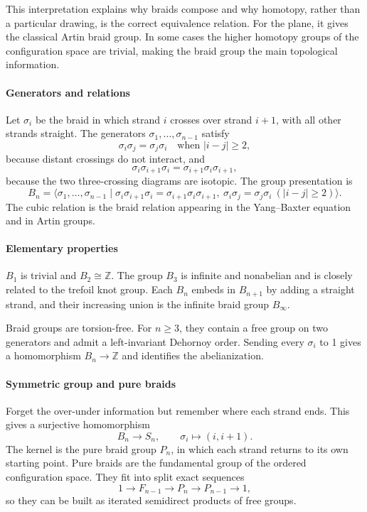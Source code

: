 This interpretation explains why braids compose and why homotopy, rather than a particular drawing, is the correct equivalence relation. For the plane, it gives the classical Artin braid group. In some cases the higher homotopy groups of the configuration space are trivial, making the braid group the main topological information.

\paragraph{Generators and relations}

Let $\sigma_i$ be the braid in which strand $i$ crosses over strand $i+1$, with all other strands straight. The generators $\sigma_1,\ldots,\sigma_{n-1}$ satisfy
\[
 \sigma_i\sigma_j=\sigma_j\sigma_i\quad\text{when }|i-j|\geq2,
\]
because distant crossings do not interact, and
\[
 \sigma_i\sigma_{i+1}\sigma_i=
 \sigma_{i+1}\sigma_i\sigma_{i+1},
\]
because the two three-crossing diagrams are isotopic. The group presentation is
\[
 B_n=\langle\sigma_1,\ldots,\sigma_{n-1}\mid
 \sigma_i\sigma_{i+1}\sigma_i=\sigma_{i+1}\sigma_i\sigma_{i+1},
 \ \sigma_i\sigma_j=\sigma_j\sigma_i\ (|i-j|\geq2)\rangle.
\]
The cubic relation is the braid relation appearing in the Yang--Baxter equation and in Artin groups.

\paragraph{Elementary properties}

$B_1$ is trivial and $B_2\cong\mathbb Z$. The group $B_3$ is infinite and nonabelian and is closely related to the trefoil knot group. Each $B_n$ embeds in $B_{n+1}$ by adding a straight strand, and their increasing union is the infinite braid group $B_\infty$.

Braid groups are torsion-free. For $n\geq3$, they contain a free group on two generators and admit a left-invariant Dehornoy order. Sending every $\sigma_i$ to 1 gives a homomorphism $B_n\to\mathbb Z$ and identifies the abelianization.

\paragraph{Symmetric group and pure braids}

Forget the over-under information but remember where each strand ends. This gives a surjective homomorphism
\[
 B_n\longrightarrow S_n,\qquad \sigma_i\mapsto(i,i+1).
\]
The kernel is the pure braid group $P_n$, in which each strand returns to its own starting point. Pure braids are the fundamental group of the ordered configuration space. They fit into split exact sequences
\[
 1\longrightarrow F_{n-1}\longrightarrow P_n\longrightarrow P_{n-1}\longrightarrow1,
\]
so they can be built as iterated semidirect products of free groups.

